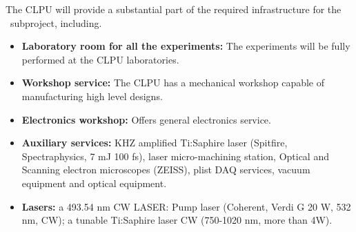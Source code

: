 The CLPU will provide a substantial part of the required infrastructure for the \BATA\ subproject, including.
 
 \begin{itemize}
    \item \textbf{Laboratory room for all the experiments:} The experiments will be fully performed at the CLPU laboratories.
    
\item \textbf{Workshop service:} The CLPU has a mechanical workshop capable of manufacturing high level designs. 

\item \textbf{Electronics workshop:} Offers general electronics service. 

\item \textbf{Auxiliary services:} KHZ amplified Ti:Saphire laser (Spitfire, Spectraphysics, 7 mJ 100 fs), laser micro-machining station, Optical and Scanning electron microscopes (ZEISS), plist DAQ services, vacuum equipment and optical equipment.   

%
%
%

\item \textbf{Lasers:} a 493.54 nm CW LASER: Pump laser (Coherent, Verdi G 20 W, 532 nm, CW); a tunable Ti:Saphire laser CW (750-1020 nm,  more than 4W).
%
%

\end{itemize}


